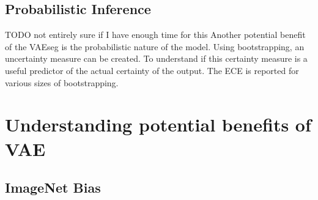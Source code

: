 \subsection{Probabilistic Inference}
TODO not entirely sure if I have enough time for this
Another potential benefit of the VAEseg is the probabilistic nature of the model. Using bootstrapping, an uncertainty measure can be created. To understand if this certainty measure is a useful predictor of the actual certainty of the output. The ECE is reported for various sizes of bootstrapping.

\section{Understanding potential benefits of VAE}
\subsection*{ImageNet Bias}





